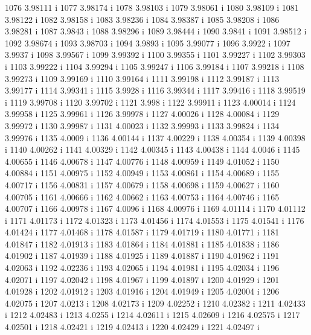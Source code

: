  1076  3.98111  i
 1077  3.98174  i
 1078  3.98103  i
 1079  3.98061  i
 1080  3.98109  i
 1081  3.98122  i
 1082  3.98158  i
 1083  3.98236  i
 1084  3.98387  i
 1085  3.98208  i
 1086  3.98281  i
 1087  3.9843  i
 1088  3.98296  i
 1089  3.98444  i
 1090  3.9841  i
 1091  3.98512  i
 1092  3.98674  i
 1093  3.98703  i
 1094  3.9893  i
 1095  3.99077  i
 1096  3.9922  i
 1097  3.9937  i
 1098  3.99567  i
 1099  3.99392  i
 1100  3.99355  i
 1101  3.99227  i
 1102  3.99303  i
 1103  3.99222  i
 1104  3.99294  i
 1105  3.99247  i
 1106  3.99184  i
 1107  3.99218  i
 1108  3.99273  i
 1109  3.99169  i
 1110  3.99164  i
 1111  3.99198  i
 1112  3.99187  i
 1113  3.99177  i
 1114  3.99341  i
 1115  3.9928  i
 1116  3.99344  i
 1117  3.99416  i
 1118  3.99519  i
 1119  3.99708  i
 1120  3.99702  i
 1121  3.998  i
 1122  3.99911  i
 1123  4.00014  i
 1124  3.99958  i
 1125  3.99961  i
 1126  3.99978  i
 1127  4.00026  i
 1128  4.00084  i
 1129  3.99972  i
 1130  3.99987  i
 1131  4.00023  i
 1132  3.99993  i
 1133  3.99824  i
 1134  3.99976  i
 1135  4.0009  i
 1136  4.00144  i
 1137  4.00229  i
 1138  4.00354  i
 1139  4.00398  i
 1140  4.00262  i
 1141  4.00329  i
 1142  4.00345  i
 1143  4.00438  i
 1144  4.0046  i
 1145  4.00655  i
 1146  4.00678  i
 1147  4.00776  i
 1148  4.00959  i
 1149  4.01052  i
 1150  4.00884  i
 1151  4.00975  i
 1152  4.00949  i
 1153  4.00861  i
 1154  4.00689  i
 1155  4.00717  i
 1156  4.00831  i
 1157  4.00679  i
 1158  4.00698  i
 1159  4.00627  i
 1160  4.00705  i
 1161  4.00666  i
 1162  4.00662  i
 1163  4.00753  i
 1164  4.00746  i
 1165  4.00707  i
 1166  4.00978  i
 1167  4.0096  i
 1168  4.00976  i
 1169  4.01114  i
 1170  4.01112  i
 1171  4.01173  i
 1172  4.01323  i
 1173  4.01456  i
 1174  4.01553  i
 1175  4.01541  i
 1176  4.01424  i
 1177  4.01468  i
 1178  4.01587  i
 1179  4.01719  i
 1180  4.01771  i
 1181  4.01847  i
 1182  4.01913  i
 1183  4.01864  i
 1184  4.01881  i
 1185  4.01838  i
 1186  4.01902  i
 1187  4.01939  i
 1188  4.01925  i
 1189  4.01887  i
 1190  4.01962  i
 1191  4.02063  i
 1192  4.02236  i
 1193  4.02065  i
 1194  4.01981  i
 1195  4.02034  i
 1196  4.02071  i
 1197  4.02042  i
 1198  4.01967  i
 1199  4.01897  i
 1200  4.01929  i
 1201  4.01928  i
 1202  4.01912  i
 1203  4.01916  i
 1204  4.01949  i
 1205  4.02004  i
 1206  4.02075  i
 1207  4.0213  i
 1208  4.02173  i
 1209  4.02252  i
 1210  4.02382  i
 1211  4.02433  i
 1212  4.02483  i
 1213  4.0255  i
 1214  4.02611  i
 1215  4.02609  i
 1216  4.02575  i
 1217  4.02501  i
 1218  4.02421  i
 1219  4.02413  i
 1220  4.02429  i
 1221  4.02497  i
